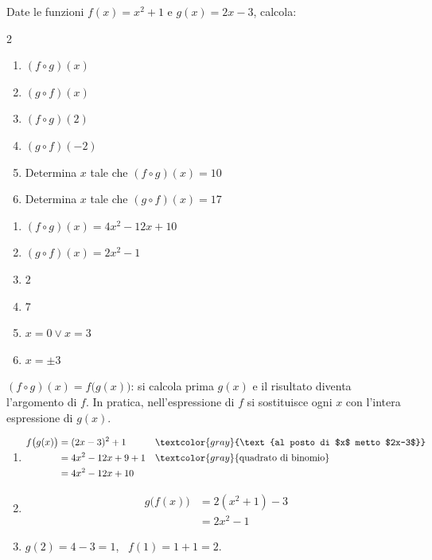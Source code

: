 \begin{question}[ID=1.2, subtitle={Composizione di funzioni polinomiali}, difficulty=facile, tags={funzioni, composizione}]
Date le funzioni $f(x)=x^2+1$ e $g(x)=2x-3$, calcola:
\begin{multicols}{2}
\begin{enumerate}[leftmargin=3.2cm]
    \item $(f\circ g)(x)$
    \item $(g\circ f)(x)$
    \item $(f\circ g)(2)$
    \item $(g\circ f)(-2)$
    \item Determina $x$ tale che $(f\circ g)(x)=10$
    \item Determina $x$ tale che $(g\circ f)(x)=17$
\end{enumerate}
\end{multicols}
\begin{solution}
\begin{enumerate}
    \item $(f\circ g)(x)=4x^2-12x+10$
    \item $(g\circ f)(x)=2x^2-1$
    \item $2$
    \item $7$
    \item $x=0\vee x=3$
    \item $x=\pm3$
\end{enumerate}
\end{solution}
\begin{explanation}
$(f\circ g)(x)=f\big(g(x)\big)$: si calcola prima $g(x)$ e il risultato diventa l'argomento di $f$. In pratica, nell'espressione di $f$ si sostituisce ogni $x$ con l'intera espressione di $g(x)$.
\begin{enumerate}
    \item \[\begin{aligned}
    f\big(g(x)\big) &= (2x-3)^2+1 && \textcolor{gray}{\text{al posto di $x$ metto $2x-3$}}\\
    &= 4x^2-12x+9+1 && \textcolor{gray}{\text{quadrato di binomio}}\\
    &= 4x^2-12x+10
    \end{aligned}\]
    \item \[\begin{aligned}
    g\big(f(x)\big) &= 2(x^2+1)-3\\
    &= 2x^2-1
    \end{aligned}\]
    \item $g(2)=4-3=1$, \ $f(1)=1+1=2$.

\end{enumerate}
\end{explanation}
\end{question}
